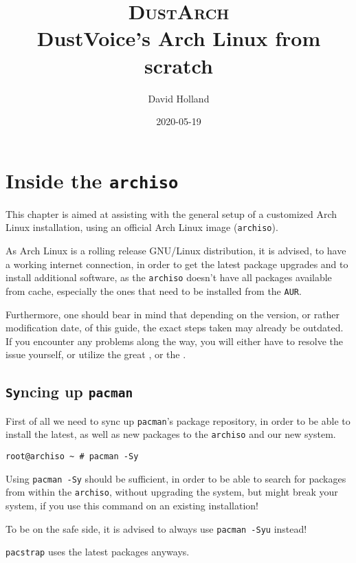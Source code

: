 \documentclass[10pt]{dustdoc}
\title{\texorpdfstring{{\scshape\huge DustArch\\\vspace{\parskip}}}{DustArch: }DustVoice’s Arch Linux from scratch}
\author{David Holland}
\date{2020-05-19}
\begin{document}
\maketitle

\tableofcontents

\chapter{Inside the \texttt{archiso}}
\label{sec:inside-the-archiso}

This chapter is aimed at assisting with the general setup of a customized Arch Linux installation, using an official Arch Linux image (\texttt{archiso}).

\begin{NOTE}
    As Arch Linux is a rolling release GNU/Linux distribution, it is advised, to have a working internet connection, in order to get the latest package upgrades and to install additional software, as the \texttt{archiso} doesn't have all packages available from cache, especially the ones that need to be installed from the \texttt{AUR}.

    Furthermore, one should bear in mind that depending on the version, or rather modification date, of this guide, the exact steps taken may already be outdated.
    If you encounter any problems along the way, you will either have to resolve the issue yourself, or utilize the great , or the .
\end{NOTE}

\section{\texttt{Sy}ncing up \texttt{pacman}}
\label{sec:syncing-up-pacman}

First of all we need to sync up \texttt{pacman}'s package repository, in order to be able to install the latest, as well as new packages to the \texttt{archiso} and our new system.

\begin{verbatim}
root@archiso ~ # pacman -Sy
\end{verbatim}

\begin{WARNING}
    Using \texttt{pacman -Sy} should be sufficient, in order to be able to search for packages from within the \texttt{archiso}, without upgrading the system, but might break your system, if you use this command on an existing installation!

    To be on the safe side, it is advised to always use \texttt{pacman -Syu} instead!

    \texttt{pacstrap} uses the latest packages anyways.
\end{WARNING}
\end{document}
